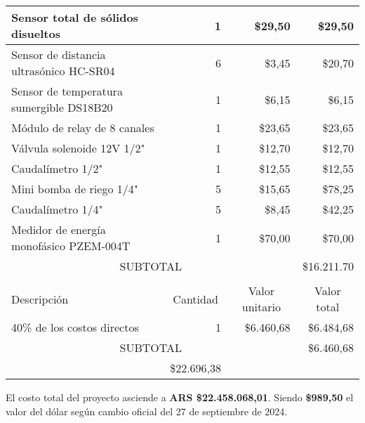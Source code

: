 \begin{table}[htpb]
\begin{tabularx}{\linewidth}{@{}|X|c|r|r|@{}}
		Sensor total de sólidos disueltos   & 
		\multicolumn{1}{r|}{1} & \multicolumn{1}{r|}{\$29,50} & \multicolumn{1}{r|}{\$29,50} \\ \hline
		Sensor de distancia ultrasónico HC-SR04  & 
		\multicolumn{1}{r|}{6} & \multicolumn{1}{r|}{\$3,45} & \multicolumn{1}{r|}{\$20,70} \\ \hline
		Sensor de temperatura sumergible DS18B20  & 
		\multicolumn{1}{r|}{1} & \multicolumn{1}{r|}{\$6,15} & \multicolumn{1}{r|}{\$6,15} \\ \hline
		Módulo de relay de 8 canales  & 
		\multicolumn{1}{r|}{1} & \multicolumn{1}{r|}{\$23,65} & \multicolumn{1}{r|}{\$23,65} \\ \hline
		Válvula solenoide 12V 1/2"  & 
		\multicolumn{1}{r|}{1} & \multicolumn{1}{r|}{\$12,70} & \multicolumn{1}{r|}{\$12,70} \\ \hline
		Caudalímetro 1/2"  & 
		\multicolumn{1}{r|}{1} & \multicolumn{1}{r|}{\$12,55} & \multicolumn{1}{r|}{\$12,55} \\ \hline
		Mini bomba de riego 1/4"  & 
		\multicolumn{1}{r|}{5} & \multicolumn{1}{r|}{\$15,65} & \multicolumn{1}{r|}{\$78,25} \\ \hline
		Caudalímetro 1/4"  & 
		\multicolumn{1}{r|}{5} & \multicolumn{1}{r|}{\$8,45} & \multicolumn{1}{r|}{\$42,25} \\ \hline
		Medidor de energía monofásico PZEM-004T  & 
		\multicolumn{1}{r|}{1} & \multicolumn{1}{r|}{\$70,00} & \multicolumn{1}{r|}{\$70,00} \\ \hline
		
		\multicolumn{3}{|c|}{SUBTOTAL} & \multicolumn{1}{r|}{\$16.211.70} \\ \hline
		\rowcolor[HTML]{C0C0C0}
		\multicolumn{4}{|c|}{\cellcolor[HTML]{C0C0C0}COSTOS INDIRECTOS} \\ \hline
		\rowcolor[HTML]{C0C0C0}
		Descripción                                                 &
		\multicolumn{1}{c|}{\cellcolor[HTML]{C0C0C0}Cantidad}       &
		\multicolumn{1}{c|}{\cellcolor[HTML]{C0C0C0}Valor unitario} &
		\multicolumn{1}{c|}{\cellcolor[HTML]{C0C0C0}Valor total}        \\ \hline
		40\% de los costos directos   & 
		\multicolumn{1}{r|}{1} & \multicolumn{1}{r|}{\$6.460,68} & \multicolumn{1}{r|}{\$6.484,68} \\ \hline
		
		\multicolumn{3}{|c|}{SUBTOTAL}                              &
		\multicolumn{1}{r|}{\$6.460,68}                                           \\ \hline
		\rowcolor[HTML]{C0C0C0}
		\multicolumn{3}{|c|}{TOTAL}                                 & \$22.696,38
		\\ \hline
	\end{tabularx}%
\end{table}

\vspace{5mm}
El costo total del proyecto asciende a \textbf{ARS \$22.458.068,01}. Siendo \textbf{\$989,50} el valor del dólar según cambio oficial del 27 de septiembre de 2024.